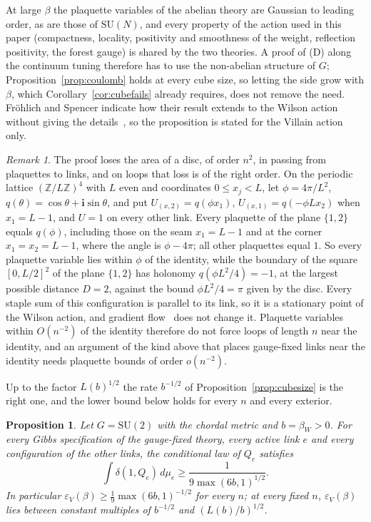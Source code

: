 \documentclass[11pt]{amsart}
\newtheorem{proposition}[theorem]{Proposition}
\theoremstyle{definition}
\theoremstyle{remark}
\newtheorem{remark}[theorem]{Remark}
\numberwithin{equation}{section}
\newcommand{\Z}{\mathbb{Z}}
\newcommand{\SU}{\mathrm{SU}}
\begin{document}
At large $\beta$ the plaquette variables of the abelian theory are
Gaussian to leading order, as are those of $\SU(N)$, and every property of
the action used in this paper (compactness, locality, positivity and
smoothness of the weight, reflection positivity, the forest gauge) is shared
by the two theories. A proof of (D) along the continuum tuning therefore has
to use the non-abelian structure of $G$; Proposition~\ref{prop:coulomb}
holds at every cube size, so letting the side grow with $\beta$, which
Corollary~\ref{cor:cubefails} already requires, does not remove the need.
Fr\"ohlich and Spencer indicate how their result extends to the Wilson
action without giving the details~\cite[Sect.~2]{FS82}, so the
proposition is stated for the Villain action only.

\begin{remark}\label{rem:fluxloop}
The proof loses the area of a disc, of order $n^2$, in passing from plaquettes
to links, and on loops that loss is of the right order. On the periodic
lattice $(\Z/L\Z)^4$ with $L$ even and coordinates $0\le x_j<L$, let
$\phi=4\pi/L^2$, $q(\theta)=\cos\theta+\mathbf i\sin\theta$, and put
$U_{(x,2)}=q(\phi x_1)$, $U_{(x,1)}=q(-\phi Lx_2)$ when $x_1=L-1$, and $U=1$ on
every other link. Every plaquette of the plane $\{1,2\}$ equals $q(\phi)$,
including those on the seam $x_1=L-1$ and at the corner $x_1=x_2=L-1$, where
the angle is $\phi-4\pi$; all other plaquettes equal $1$. So every plaquette
variable lies within $\phi$ of the identity, while the boundary of the square
$[0,L/2]^2$ of the plane $\{1,2\}$ has holonomy $q(\phi L^2/4)=-1$, at the
largest possible distance $D=2$, against the bound $\phi L^2/4=\pi$ given by
the disc. Every staple sum of this configuration is parallel to its link, so
it is a stationary point of the Wilson action, and gradient
flow~\cite{Lus10} does not change it. Plaquette variables within $O(n^{-2})$
of the identity therefore do not force loops of length $n$ near the identity,
and an argument of the kind above that places gauge-fixed links near the
identity needs plaquette bounds of order $o(n^{-2})$.
\end{remark}

Up to the factor $L(b)^{1/2}$ the rate $b^{-1/2}$ of
Proposition~\ref{prop:cubesize} is the right one, and the lower bound below
holds for every $n$ and every exterior.

\begin{proposition}\label{prop:epslower}
Let $G=\SU(2)$ with the chordal metric and $b=\beta_W>0$. For every Gibbs
specification of the gauge-fixed theory, every active link $e$ and every
configuration of the other links, the conditional law of $Q_e$ satisfies
\[
\int\delta(1,Q_e)\,d\mu_e\ge\frac1{9\max(6b,1)^{1/2}} .
\]
In particular $\varepsilon_V(\beta)\ge\frac19\max(6b,1)^{-1/2}$ for every
$n$; at every fixed $n$, $\varepsilon_V(\beta)$ lies between constant
multiples of $b^{-1/2}$ and $(L(b)/b)^{1/2}$.
\end{proposition}
\end{document}

